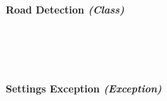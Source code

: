 \begin{flushleft}
\begin{enumerate}
    \begin{figure}[H]
        \centering
    \end{figure}\\

    \bk

    \paragraph{Road Detection \textit{(Class)}} \mbox{} \\

    \begin{figure}[H]
        \centering
    \end{figure}\\

    \bk

    \paragraph{Settings Exception \textit{(Exception)}} \mbox{} \\


\end{enumerate}
\end{flushleft}
